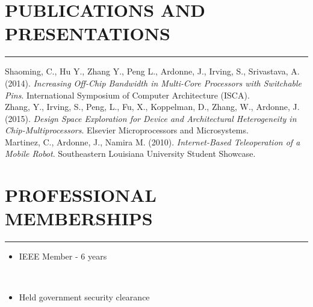 \documentclass{res}
\begin{document}
\begin{resume}
\section{PUBLICATIONS AND PRESENTATIONS}
	\vspace{0.005in}	
	\rule{\textwidth}{0.5pt}
	Shaoming, C., Hu Y., Zhang Y., Peng L., Ardonne, J., Irving, S., Srivastava, A. (2014). \textit{Increasing Off-Chip Bandwidth in Multi-Core Processors with Switchable Pins}. International Symposium of Computer Architecture (ISCA).\\
	
	\vspace{-0.25in}
	Zhang, Y., Irving, S., Peng, L., Fu, X., Koppelman, D., Zhang, W., Ardonne, J. (2015).  \textit{Design Space Exploration for Device and Architectural Heterogeneity in Chip-Multiprocessors}.  Elsevier Microprocessors and Microsystems. \\
	
	\vspace{-0.25in}
	Martinez, C., Ardonne, J., Namira M. (2010). \textit{Internet-Based Teleoperation of a Mobile Robot}. Southeastern Louisiana University Student Showcase.
	\clearpage


\section{PROFESSIONAL MEMBERSHIPS}
	\vspace{0.005in}	
	\rule{\textwidth}{0.5pt}	
	\vspace{-0.3in}
	\begin{multicols}{2}
		{
			\begin{itemize}
				\item IEEE Member - 6 years
			\end{itemize} 
			\ %
			\vspace{-0.175in}
			\begin{itemize}
				\item Held government security clearance
			\end{itemize}
		}
	\end{multicols}	


\end{resume}
\end{document}
